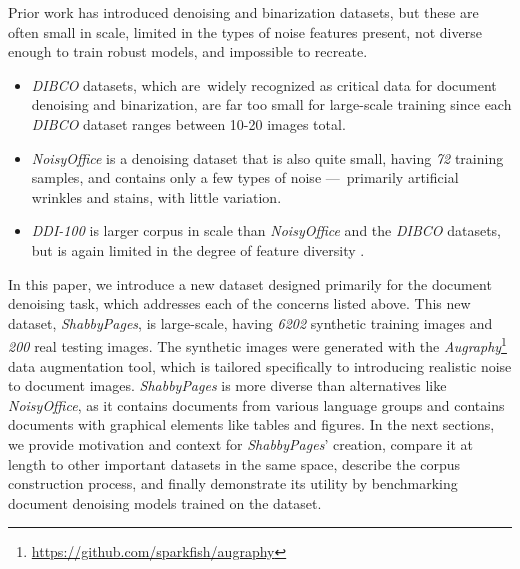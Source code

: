 \documentclass[runningheads]{llncs}
\begin{document}
Prior work has introduced denoising and binarization datasets, but these are often small in scale, limited in the types of noise features present, not diverse enough to train robust models, and impossible to recreate.
\begin{itemize}
\item \emph{DIBCO} datasets, which are widely recognized as critical data for document denoising and binarization, are far too small for large-scale training since each \emph{DIBCO} dataset ranges between 10-20 images total.
\item \emph{NoisyOffice} \cite{ref_NoisyOfficeDatabase} is a denoising dataset that is also quite small, having \emph{72} training samples, and contains only a few types of noise — primarily artificial wrinkles and stains, with little variation.
\item \emph{DDI-100} \cite{ddi-100-2019} is larger corpus in scale than \emph{NoisyOffice} and the \emph{DIBCO} datasets, but is again limited in the degree of feature diversity \cite{detection-masking-2022}.
\end{itemize}

In this paper, we introduce a new dataset designed primarily for the document denoising task, which addresses each of the concerns listed above.
This new dataset, \emph{ShabbyPages}, is large-scale, having \emph{6202} synthetic training images and \emph{200} real testing images.
The synthetic images were generated with the \emph{Augraphy}\footnote{\url{https://github.com/sparkfish/augraphy}} data augmentation tool, which is tailored specifically to introducing realistic noise to document images.
\emph{ShabbyPages} is more diverse than alternatives like \emph{NoisyOffice}, as it contains documents from various language groups and contains documents with graphical elements like tables and figures.
In the next sections, we provide motivation and context for \emph{ShabbyPages}' creation, compare it at length to other important datasets in the same space, describe the corpus construction process, and finally demonstrate its utility by benchmarking document denoising models trained on the dataset.
\end{document}
